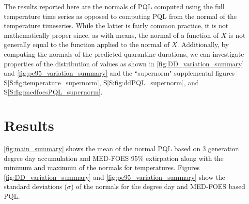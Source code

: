 \documentclass[10pt,a4paper,twocolumn]{article}
\begin{document}
The results reported here are the normals of PQL computed using the full temperature time series
as opposed to computing PQL from the normal of the temperature timeseries.
While the latter is fairly common practice, it is not mathematically proper 
since, as with means, the normal of a function of $X$ is not generally equal to the function applied to the normal of $X$.
Additionally, by computing the normals of the predicted quarantine durations, 
we can investigate properties of the distribution of values as shown in 
\autoref{fig:DD_variation_summary} and \autoref{fig:pe95_variation_summary} 
and the ``supernorm" supplemental figures 
S\ref{S:fig:temperature_supernorm}, 
S\ref{S:fig:ddPQL_supernorm},
and S\ref{S:fig:medfoesPQL_supernorm}.

%
%

\section*{Results}


\autoref{fig:main_summary} shows 
the mean of the normal PQL based on 3 generation degree day accumulation 
and MED-FOES 95\% extirpation
along with the minimum and maximum of the normals for temperatures.
Figures \ref{fig:DD_variation_summary} and \ref{fig:pe95_variation_summary} show the 
standard deviations ($\sigma$) of the normals for the degree day and MED-FOES based PQL.
\end{document}
